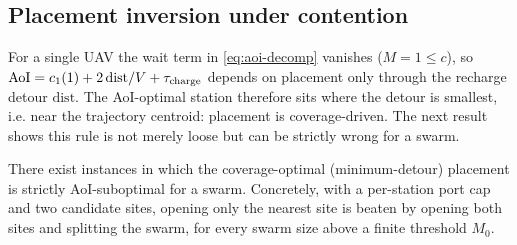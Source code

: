 \subsection{Placement inversion under contention}

For a single UAV the wait term in \eqref{eq:aoi-decomp} vanishes ($M=1\le c$), so
$\mathrm{AoI}=c_1(1)+2\,\mathrm{dist}/V+\tau_{\mathrm{charge}}$ depends on placement only
through the recharge detour $\mathrm{dist}$. The AoI-optimal station therefore sits
where the detour is smallest, i.e. near the trajectory centroid: placement is
coverage-driven. The next result shows this rule is not merely loose but can be
strictly wrong for a swarm.

\begin{proposition}
\label{prop:inversion}
There exist instances in which the coverage-optimal (minimum-detour) placement is
strictly AoI-suboptimal for a swarm. Concretely, with a per-station port cap and
two candidate sites, opening only the nearest site is beaten by opening both sites
and splitting the swarm, for every swarm size above a finite threshold $M_0$.
\end{proposition}

